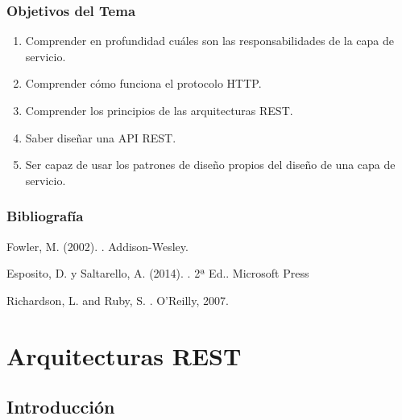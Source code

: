\documentclass[a4paper,slidestop,xcolor=pst,blue]{beamer}
\begin{document}
\begin{frame}[c]
    \frametitle{Objetivos del Tema}
    \begin{enumerate}[<+->]
         \item Comprender en profundidad cuáles son las responsabilidades de la capa de servicio.
         \item Comprender cómo funciona el protocolo HTTP.
         \item Comprender los principios de las arquitecturas REST.
         \item Saber diseñar una API REST.
         \item Ser capaz de usar los patrones de diseño propios del diseño de una capa de servicio.
    \end{enumerate}
\end{frame}

\begin{frame}[c]
    \frametitle{Bibliografía}
    \begin{thebibliography}{1}

        Fowler, M. (2002).
        .
        \newblock Addison-Wesley.

        Esposito, D. y Saltarello, A. (2014).
        . 2ª Ed..
        \newblock Microsoft Press

        Richardson, L. and Ruby, S.
        .
        \newblock  O'Reilly, 2007.

    \end{thebibliography}
\end{frame}

\section{Arquitecturas REST}

\subsection{Introducción}
\end{document}
